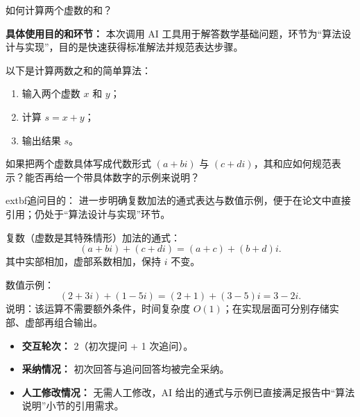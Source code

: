 \begin{block}[colback=orange!10, colframe=orange!60, title={\textcolor{black}{用户提问}}]
如何计算两个虚数的和？
\vspace{0.5em}
\begin{flushright}
    \scriptsize
    \begin{flushleft}
        \textbf{具体使用目的和环节：} 本次调用 AI 工具用于解答数学基础问题，环节为“算法设计与实现”，目的是快速获得标准解法并规范表达步骤。
    \end{flushleft}
\end{flushright}
\end{block}


\begin{GeminiBlock}
以下是计算两数之和的简单算法：
\begin{enumerate}
    \item 输入两个虚数 $x$ 和 $y$；
    \item 计算 $s = x + y$；
    \item 输出结果 $s$。
\end{enumerate}
\end{GeminiBlock}

\begin{block}[colback=orange!10, colframe=orange!60, title={\textcolor{black}{用户追问}}]
如果把两个虚数具体写成代数形式 $(a+bi)$ 与 $(c+di)$，其和应如何规范表示？能否再给一个带具体数字的示例来说明？
\vspace{0.5em}
\begin{flushright}
    \scriptsize
    \begin{flushleft}
        	extbf{追问目的：} 进一步明确复数加法的通式表达与数值示例，便于在论文中直接引用；仍处于“算法设计与实现”环节。
    \end{flushleft}
\end{flushright}
\end{block}

\begin{GeminiBlock}
复数（虚数是其特殊情形）加法的通式：
\[
(a+bi) + (c+di) = (a+c) + (b+d)i.
\]
其中实部相加，虚部系数相加，保持 $i$ 不变。

数值示例：
\[
(2+3i) + (1-5i) = (2+1) + (3-5)i = 3 - 2i.
\]
说明：该运算不需要额外条件，时间复杂度 $O(1)$；在实现层面可分别存储实部、虚部再组合输出。
\end{GeminiBlock}

\begin{block}[colback=green!10, colframe=green!50, title={\textcolor{black}{采纳和人工修改情况}}]
\begin{itemize}
    \item \textbf{交互轮次：} 2（初次提问 + 1 次追问）。
    \item \textbf{采纳情况：} 初次回答与追问回答均被完全采纳。
    \item \textbf{人工修改情况：} 无需人工修改，AI 给出的通式与示例已直接满足报告中“算法说明”小节的引用需求。
\end{itemize}
\end{block}
